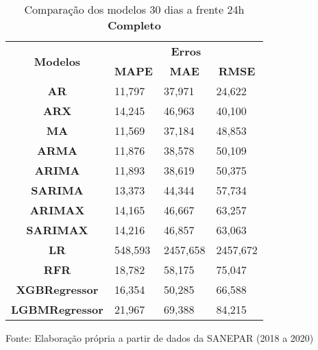 \begin{table}[H]
	\centering
	\caption{Comparação dos modelos 30 dias a frente 24h \textbf{Completo} }\label{tb:60-24cm}
	\begin{tabular}{@{}clll@{}}
		\toprule
		\multirow{2}{*}{\textbf{Modelos}} & \multicolumn{3}{c}{\textbf{Erros}}                                                                       \\ \cmidrule(l){2-4} 
		& \multicolumn{1}{c}{\textbf{MAPE}} & \multicolumn{1}{c}{\textbf{MAE}} & \multicolumn{1}{c}{\textbf{RMSE}} \\ \hline
\textbf{AR}                       & 11,797                            & 37,971                           & 24,622                            \\
\textbf{ARX}                      & 14,245                            & 46,963                           & 40,100                            \\
\textbf{MA}                       & 11,569                            & 37,184                           & 48,853                            \\
\textbf{ARMA}                     & 11,876                            & 38,578                           & 50,109                            \\
\textbf{ARIMA}                    & 11,893                            & 38,619                           & 50,375                            \\
\textbf{SARIMA}                   & 13,373                            & 44,344                           & 57,734                            \\
\textbf{ARIMAX}                   & 14,165                            & 46,667                           & 63,257                            \\
\textbf{SARIMAX}                  & 14,216                            & 46,857                           & 63,063                            \\
\textbf{LR}        & 548,593                           & 2457,658                         & 2457,672                          \\
\textbf{RFR}  & 18,782                            & 58,175                           & 75,047                            \\
\textbf{XGBRegressor}             & 16,354                            & 50,285                           & 66,588                            \\
\textbf{LGBMRegressor}            & 21,967                            & 69,388                           & 84,215                            \\ \bottomrule
	\end{tabular}

Fonte: Elaboração própria a partir de dados da SANEPAR (2018 a 2020)
\end{table}